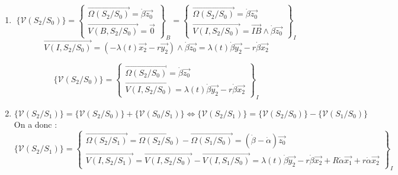 {\begin{enumerate}
$$
\overrightarrow{V(I,S_1/S_0)} =\left( -R\overrightarrow{y_1} - r \overrightarrow{y_2} \right) \wedge \dot{\alpha}\overrightarrow{z_0} =- R\dot{\alpha}\overrightarrow{x_1} - r\dot{\alpha}\overrightarrow{x_2}
$$
$$\{\mathcal{V}(S_1/S_0)\} = 
\left\{
\begin{array}{l}
\overrightarrow{\Omega(S_1/S_0)} = \dot{\alpha}\overrightarrow{z_0} \\
\overrightarrow{V(I,S_1/S_0)} = -R\dot{\alpha}\overrightarrow{x_1} - r\dot{\alpha}\overrightarrow{x_2}
\end{array}
\right\}_I
$$
\item $$\{\mathcal{V}(S_2/S_0)\} = 
\left\{
\begin{array}{l}
\overrightarrow{\Omega(S_2/S_0)} = \dot{\beta}\overrightarrow{z_0} \\
\overrightarrow{V(B,S_2/S_0)} = \overrightarrow{0}
\end{array}
\right\}_B =
\left\{
\begin{array}{l}
\overrightarrow{\Omega(S_2/S_0)} = \dot{\beta}\overrightarrow{z_0} \\
\overrightarrow{V(I,S_2/S_0)} = \overrightarrow{IB} \wedge \dot{\beta}\overrightarrow{z_0}
\end{array}
\right\}_I
$$
$$
\overrightarrow{V(I,S_2/S_0)} =\left( -\lambda(t)\overrightarrow{x_2} - r \overrightarrow{y_2} \right) \wedge \dot{\beta}\overrightarrow{z_0} = \lambda(t) \dot{\beta}\overrightarrow{y_2} - r\dot{\beta}\overrightarrow{x_2}
$$

$$\{\mathcal{V}(S_2/S_0)\} = 
\left\{
\begin{array}{l}
\overrightarrow{\Omega(S_2/S_0)} = \dot{\beta}\overrightarrow{z_0} \\
\overrightarrow{V(I,S_2/S_0)} = \lambda(t) \dot{\beta}\overrightarrow{y_2} - r\dot{\beta}\overrightarrow{x_2}
\end{array}
\right\}_I
$$
\item $$
\{ \mathcal{V}(S_2/S_1)\} = \{ \mathcal{V}(S_2/S_0)\} + \{ \mathcal{V}(S_0/S_1)\} 
\Longleftrightarrow \{ \mathcal{V}(S_2/S_1)\} = \{ \mathcal{V}(S_2/S_0)\} - \{ \mathcal{V}(S_1/S_0)\} 
$$
On a donc : 
$$
\{ \mathcal{V}(S_2/S_1)\} =
\left\{
\begin{array}{l}
\overrightarrow{\Omega(S_2/S_1)} = \overrightarrow{\Omega(S_2/S_0)} - \overrightarrow{\Omega(S_1/S_0)}  = \left(\dot{\beta}-\dot{\alpha} \right)\overrightarrow{z_0} \\
\overrightarrow{V(I,S_2/S_1)} = \overrightarrow{V(I,S_2/S_0)} - \overrightarrow{V(I,S_1/S_0)} 
=
 \lambda(t) \dot{\beta}\overrightarrow{y_2} - r\dot{\beta}\overrightarrow{x_2} +
 R\dot{\alpha}\overrightarrow{x_1} + r\dot{\alpha}\overrightarrow{x_2}
\end{array}
\right\}_I
$$


\end{enumerate}}
